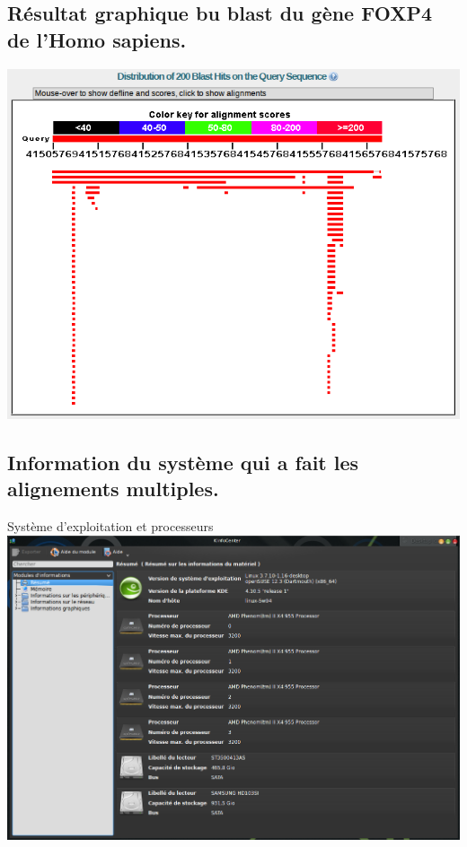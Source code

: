 \documentclass[11pt]{article} %
\begin{document}
\subsection{Résultat graphique bu blast du gène FOXP4 de l'Homo sapiens.}\label{15}
\includegraphics[width=\linewidth]{annexes/question4/FOXP4_megablast_result.png}

\subsection{Information du système qui a fait les alignements multiples.}\label{16}

Système d'exploitation et processeurs\\
\includegraphics[width=\linewidth]{annexes/question4/systeme_1.png}
\end{document}
